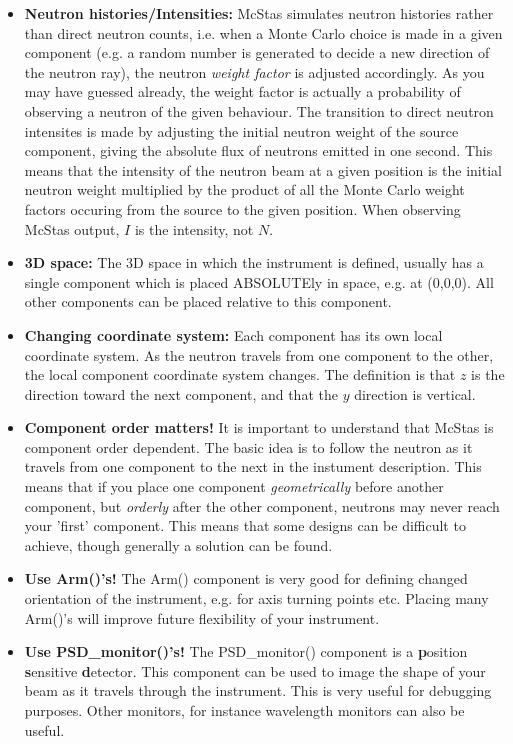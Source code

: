 \documentclass[a4paper]{article}
\begin{document}
\begin{itemize}
\item{{\bf Neutron histories/Intensities:} McStas simulates neutron
    histories rather than direct neutron counts, i.e. when a
    Monte Carlo choice is made in a given component (e.g. a random
    number is generated to decide a new direction of the neutron ray), 
    the neutron \emph{weight factor} is adjusted accordingly. As you
    may have guessed already, the weight factor is actually a
    probability of observing a neutron of the given behaviour.
    The transition to direct neutron intensites is made
    by adjusting the initial neutron weight of the source component,
    giving the absolute flux of neutrons emitted in one
    second. This means that the intensity of the neutron beam at a
    given position is the initial neutron weight multiplied by the 
    product of all the Monte Carlo weight factors occuring from the
    source to the given position.  When observing McStas output, $I$
    is the intensity, not $N$.}
\item{{\bf 3D space:} The 3D space in which the instrument is defined,
  usually has a single component which is
  placed ABSOLUTEly  in space, e.g. at (0,0,0). All other components
  can be placed relative to this component.}
\item{{\bf Changing coordinate system:} Each component has its own
    local coordinate system. As the neutron travels from one component
    to the other, the local component coordinate system changes. The
    definition is that $z$ is the direction toward the next component,
    and that the $y$ direction is vertical.}
\item{{\bf Component order matters!} It is important to understand
    that McStas is component order dependent. The basic idea is to
    follow the neutron as it travels from one component to the next in
    the instument description. This means that if you place one component
    \emph{geometrically} before another component, but \emph{orderly}
    after the other component, neutrons may never reach your 'first'
    component. This means that some designs can be difficult to
    achieve, though generally a solution can be found.}
\item{{\bf Use Arm()'s!} The Arm() component is very good for defining
  changed orientation of the instrument, e.g. for axis turning points
  etc. Placing many Arm()'s will improve future flexibility of your
  instrument.}
\item{{\bf Use PSD\_monitor()'s!} The PSD\_monitor() component is a
    {\bf p}osition {\bf s}ensitive {\bf d}etector. This component can
    be used to image the shape of your beam as it travels through the
    instrument. This is very useful for debugging purposes. Other
    monitors, for instance wavelength monitors can also be useful.}
\end{itemize}
\end{document}
